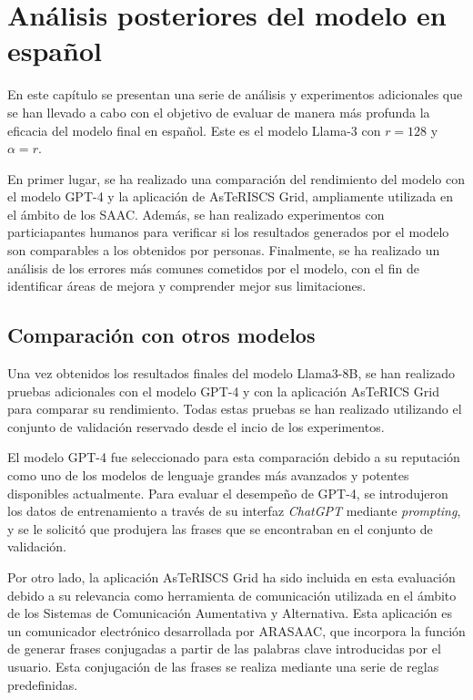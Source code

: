 \documentclass[11pt,spanish,listoffigures,listoftables]{tfgetsinf}
\begin{document}
\chapter{Análisis posteriores del modelo en español} \label{cap5}

En este capítulo se presentan una serie de análisis y experimentos adicionales que se han llevado a cabo con el objetivo de evaluar de manera más profunda la eficacia del modelo final en español. Este es el modelo Llama-3 con $r = 128$ y $\alpha = r$.

En primer lugar, se ha realizado una comparación del rendimiento del modelo con el modelo GPT-4 y la aplicación de AsTeRISCS Grid, ampliamente utilizada en el ámbito de los SAAC. Además, se han realizado experimentos con particiapantes humanos para verificar si los resultados generados por el modelo son comparables a los obtenidos por personas. Finalmente, se ha realizado un análisis de los errores más comunes cometidos por el modelo, con el fin de identificar áreas de mejora y comprender mejor sus limitaciones.

\section{Comparación con otros modelos} 

Una vez obtenidos los resultados finales del modelo Llama3-8B, se han realizado pruebas adicionales con el modelo GPT-4 y con la aplicación AsTeRICS Grid para comparar su rendimiento. Todas estas pruebas se han realizado utilizando el conjunto de validación reservado desde el incio de los experimentos.

El modelo GPT-4 fue seleccionado para esta comparación debido a su reputación como uno de los modelos de lenguaje grandes más avanzados y potentes disponibles actualmente. Para evaluar el desempeño de GPT-4, se introdujeron los datos de entrenamiento a través de su interfaz \textit{ChatGPT} mediante \textit{prompting}, y se le solicitó que produjera las frases que se encontraban en el conjunto de validación.

Por otro lado, la aplicación AsTeRISCS Grid ha sido incluida en esta evaluación debido a su relevancia como herramienta de comunicación utilizada en el ámbito de los Sistemas de Comunicación Aumentativa y Alternativa. Esta aplicación es un comunicador electrónico desarrollada por ARASAAC, que incorpora la función de generar frases conjugadas a partir de las palabras clave introducidas por el usuario. Esta conjugación de las frases se realiza mediante una serie de reglas predefinidas.
\end{document}
